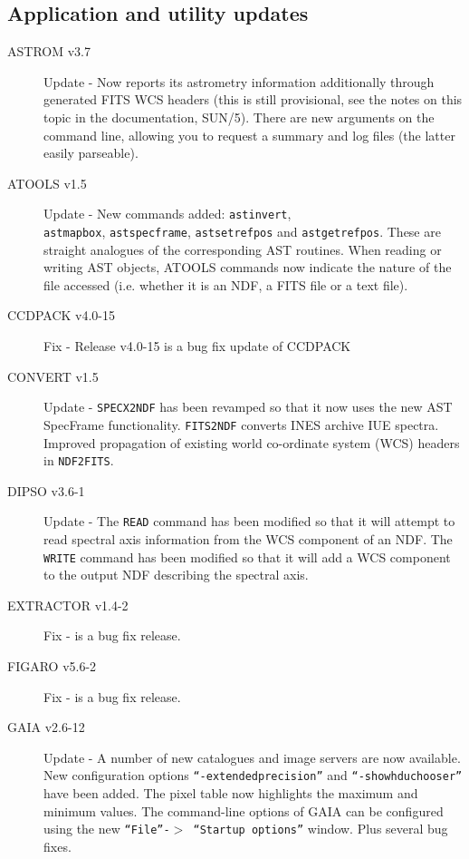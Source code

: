 \documentclass[twoside,11pt]{article}
\newcommand{\xlabel}[1]{}
\renewcommand{\_}{\texttt{\symbol{95}}}
\begin{document}
\subsection{\xlabel{application_and_utility_updates}Application and utility updates}
\label{application_and_utility_updates}

\begin{description}
\item[ASTROM v3.7] Update - Now reports its astrometry information additionally
through generated FITS WCS headers (this is still provisional, see the notes on this 
topic in the documentation, SUN/5). There are new arguments on the command line, 
allowing you to request a summary and log files (the latter easily parseable).

\item[ATOOLS v1.5] Update - New commands added: \texttt{astinvert}, \\ 
\texttt{astmapbox}, \texttt{astspecframe}, \texttt{astsetrefpos} and \texttt{astgetrefpos}. 
These are straight analogues of the corresponding AST routines. When reading or writing AST objects, 
ATOOLS commands now indicate the nature of the file accessed (i.e. whether it is an NDF, 
a FITS file or a text file).

\item[CCDPACK v4.0-15] Fix - Release v4.0-15 is a bug fix update of CCDPACK

\item[CONVERT v1.5] Update - \texttt{SPECX2NDF} has been revamped so that it now uses
the new AST SpecFrame functionality. \texttt{FITS2NDF} converts INES archive IUE
spectra. Improved propagation of existing world co-ordinate system (WCS)
headers in \texttt{NDF2FITS}.

\item[DIPSO v3.6-1] Update - The \texttt{READ} command has been modified so that it will
attempt to read spectral axis information from the WCS component of an NDF. 
The \texttt{WRITE} command has been modified so that it will add a WCS component to the
output NDF describing the spectral axis.

\item[EXTRACTOR v1.4-2] Fix - is a bug fix release.

\item[FIGARO v5.6-2] Fix - is a bug fix release.

\item[GAIA v2.6-12] Update - A number of new catalogues and image servers are now available.
New configuration options \texttt{``-extended\_precision''} and \texttt{``-show\_hdu\_chooser''} have
been added. The pixel table now highlights the maximum and minimum values. The
command-line options of GAIA can be configured using the new
\texttt{``File''-$>$ ``Startup options''} window. Plus several bug fixes.


\end{description}
\end{document}
